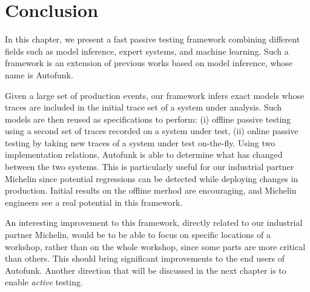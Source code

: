 \section{Conclusion}
\label{sec:testing:conclusion}

In this chapter, we present a fast passive testing framework
combining different fields such as model inference, expert
systems, and machine learning. Such a framework is an extension
of previous works based on model inference, whose name is
Autofunk.

Given a large set of production events, our framework infers
exact models whose traces are included in the initial trace set
of a system under analysis. Such models are then reused as
specifications to perform: (i) offline passive testing using a
second set of traces recorded on a system under test, (ii) online
passive testing by taking new traces of a system under test
on-the-fly.
Using two implementation relations, Autofunk is able to determine
what has changed between the two systems. This is particularly
useful for our industrial partner Michelin since potential
regressions can be detected while deploying changes in
production. Initial results on the offline merhod are
encouraging, and Michelin engineers see a real potential in this
framework.

An interesting improvement to this framework, directly related to
our industrial partner Michelin, would be to be able to focus on
specific locations of a workshop, rather than on the whole
workshop, since some parts are more critical than others. This
should bring significant improvements to the end users of
Autofunk. Another direction that will be discussed in the next
chapter is to enable \textit{active} testing.
